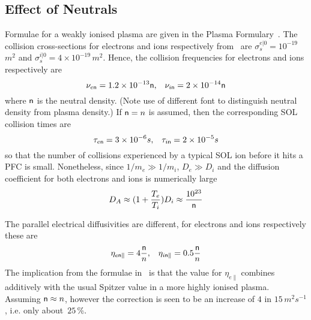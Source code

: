 \subsection{Effect of Neutrals}\label{sec:neuts}
Formulae for a weakly ionised plasma are given in the Plasma Formulary~\cite{NRLpf07}.
The collision cross-sections for electrons and ions respectively from~\cite{Ha91hydr}
are $\sigma_s^{e|0}= 10^{-19}$\,$m^2$ and
$\sigma_s^{i|0}= 4 \times 10^{-19}$\,$m^2$.
Hence, the collision frequencies for electrons and ions respectively are
\begin{equation}
\nu_{e{\sf n}}= 1.2 \times 10^{-13} {\sf n},\;\;\; \nu_{i{\sf n}}= 2 \times 10^{-14} {\sf n}
\end{equation}
where ${\sf n}$ is the neutral density.
(Note use of different font to distinguish neutral density from plasma density.)
If ${\sf n}=n$ is assumed, then
the corresponding SOL collision times are
\begin{equation}
\tau_{e{\sf n}}= 3 \times 10^{-6} s,\;\;\; \tau_{i{\sf n}}= 2 \times 10^{-5} s
\end{equation}
so that the number of collisions experienced by a typical SOL ion
before it hits a PFC is small.
Nonetheless, since $1/m_e \gg 1/m_i$, $D_e \gg D_i$ and the
diffusion coefficient for both electrons and ions is numerically large
\begin{equation}
D_A \approx (1+\frac{T_e}{T_i}) D_i \approx \frac{10^{23}}{{\sf n}}
\end{equation}

The parallel electrical diffusivities are different,
for electrons and ions respectively these are
\begin{equation}
\eta_{e {\sf n}\parallel} =4 \frac{{\sf n}}{n},\;\;\;
\eta_{i {\sf n}\parallel} =0.5 \frac{{\sf n}}{n}
\end{equation}
The implication from the formulae in~\cite{Le06emer} is that 
the value for $\eta_{e \parallel}$ combines additively with the usual
Spitzer value in a more
highly ionised plasma. Assuming ${\sf n} \approx n$, however the correction
is seen to be an increase of $4$ in $15$\,$m^2s^{-1}$, i.e. only about~$25$\,\%.

